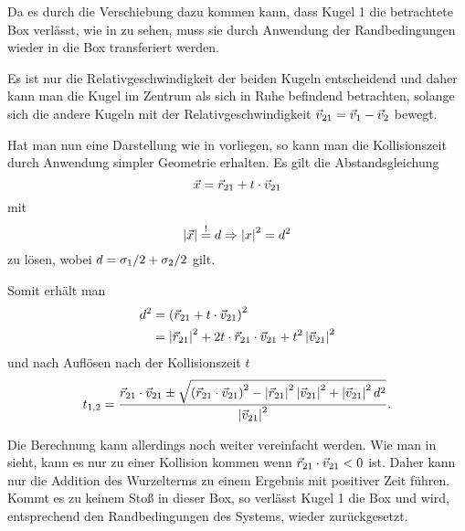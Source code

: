 

Da es durch die Verschiebung dazu kommen kann, dass Kugel 1 die betrachtete Box verlässt, wie in  zu sehen, muss sie durch Anwendung der Randbedingungen wieder in die Box transferiert werden.



Es ist nur die Relativgeschwindigkeit der beiden Kugeln entscheidend und daher kann man die Kugel im Zentrum als sich in Ruhe befindend betrachten, solange sich die andere Kugeln mit der Relativgeschwindigkeit $\vec{v}_{21}=\vec{v}_1-\vec{v}_2$ bewegt.
 


Hat man nun eine Darstellung wie in  vorliegen, so kann man die Kollisionszeit durch Anwendung simpler Geometrie erhalten.
Es gilt die Abstandsgleichung 
\begin{equation}
	\vec{x} = \vec{r}_{21} + t\cdot\vec{v}_{21}
\end{equation}
mit 
\begin{equation}
	\left|\vec{x}\right| \overset{!}{=} d \Rightarrow \left|x\right|^2 = d^2
\end{equation}
zu lösen, wobei $d=\sigma_1/2 + \sigma_2/2$ gilt.

Somit erhält man
\begin{align}
	d^2	&= \left(\vec{r}_{21} + t\cdot\vec{v}_{21} \right)^2 \\
			&= \left|\vec{r}_{21}\right|^2 + 2t\cdot\vec{r}_{21}\cdot\vec{v}_{21} + t^2\left|\vec{v}_{21}\right|^2
\end{align}
und nach Auflösen nach der Kollisionszeit $t$
\begin{equation}
	t_{1,2}=\frac{\vec{r}_{21}\cdot\vec{v}_{21} \pm \sqrt{\left(\vec{r}_{21}\cdot\vec{v}_{21}\right)^2 - \left|\vec{r}_{21}\right|^2\left|\vec{v}_{21}\right|^2 + \left|\vec{v}_{21}\right|^2d^2}}{\left|\vec{v}_{21}\right|^2}.
\end{equation}

Die Berechnung kann allerdings noch weiter vereinfacht werden. Wie man in  sieht, kann es nur zu einer Kollision kommen wenn $\vec{r}_{21}\cdot\vec{v}_{21} < 0$ ist. Daher kann nur die Addition des Wurzelterms zu einem Ergebnis mit positiver Zeit führen.\\
Kommt es zu keinem Stoß in dieser Box, so verlässt Kugel 1 die Box und wird, entsprechend den Randbedingungen des Systems, wieder zurückgesetzt.
